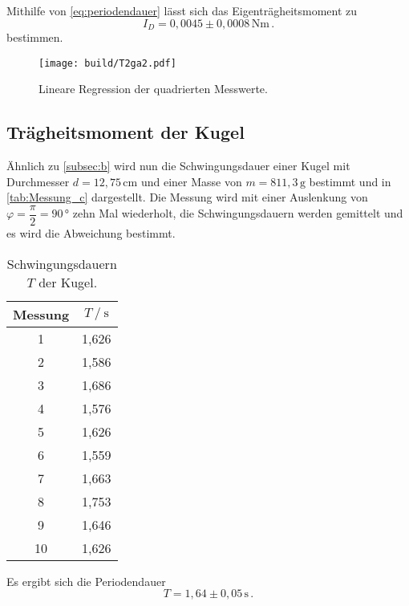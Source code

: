 Mithilfe von \eqref{eq:periodendauer} lässt sich das Eigenträgheitsmoment zu
\begin{equation*}
  I_D = 0,0045 \pm 0,0008 \,\unit{\newton\meter} \,.
\end{equation*}
bestimmen.

\begin{figure}[H]
  \centering
  \texttt{[image: build/T2ga2.pdf]}
  \caption{Lineare Regression der quadrierten Messwerte.}
  \label{fig:T2ga2}
\end{figure}

\subsection{Trägheitsmoment der Kugel}
\label{subsec:c}

Ähnlich zu \autoref{subsec:b} wird nun die Schwingungsdauer einer Kugel mit Durchmesser $d = 12,75 \, \unit{\centi\meter}$ und einer Masse von $m = 811,3 \,\unit{\gram}$ bestimmt und in \autoref{tab:Messung_c} dargestellt.
Die Messung wird mit einer Auslenkung von $\varphi = \dfrac{π}{2} = 90 \,\unit{\degree}$ zehn Mal wiederholt, die Schwingungsdauern werden gemittelt und es wird die Abweichung bestimmt.

\begin{table}[H] %
  \centering
  \begin{tabular}{S[table-format=2.0] S[table-format=1.2]}
      \toprule
      {Messung} & {$T \mathbin{/} \unit{\second}$}\\
        & 1,626 \\
          2  & 1,586 \\
          3  & 1,686 \\
          4  & 1,576 \\  
          5  & 1,626 \\
          6  & 1,559 \\
          7  & 1,663 \\
          8  & 1,753 \\
          9  & 1,646 \\
          10 & 1,626 \\
      \bottomrule
  \end{tabular}
  \caption{Schwingungsdauern $T$ der Kugel.}
  \label{tab:Messung_c}
\end{table}
Es ergibt sich die Periodendauer
\begin{equation*}
  T= 1,64 \pm 0,05 \, \unit{\second} \,.
\end{equation*}

